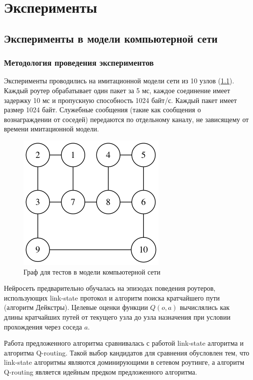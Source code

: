 \documentclass[specification, annotation]{itmo-student-thesis}
\begin{document}
\chapter{Эксперименты}

\section{Эксперименты в модели компьютерной сети}\label{experiments:simple}

\subsection{Методология проведения экспериментов}\label{experiments:simple/desc}

Эксперименты проводились на имитационной модели сети из 10 узлов
(\ref{fig-simple-network}). Каждый роутер обрабатывает один пакет за 5 мс,
каждое соединение имеет задержку 10 мс и пропускную способность 1024 байт/с.
Каждый пакет имеет размер 1024 байт. Служебные сообщения (такие как сообщения о
вознаграждении от соседей) передаются по отдельному каналу, не зависящему от
времени имитационной модели. 

\begin{figure}[!h]
  \caption{Граф для тестов в модели компьютерной сети}\label{fig-simple-network}
  \centering
  \includegraphics[scale=0.6]{graph-2.png}
\end{figure}

Нейросеть предварительно обучалась на эпизодах поведения роутеров, использующих
link-state протокол и алгоритм поиска кратчайшего пути (алгоритм Дейкстры).
Целевые оценки функции $Q(o, a)$ вычислялись как длины кратчайших путей от
текущего узла до узла назначения при условии прохождения через соседа $a$.

Работа предложенного алгоритма сравнивалась с работой link-state алгоритма и
алгоритма Q-routing. Такой выбор кандидатов для сравнения обусловлен тем, что
link-state алгоритмы являются доминирующими в сетевом роутинге, а алгоритм
Q-routing является идейным предком предложенного алгоритма.
\end{document}
